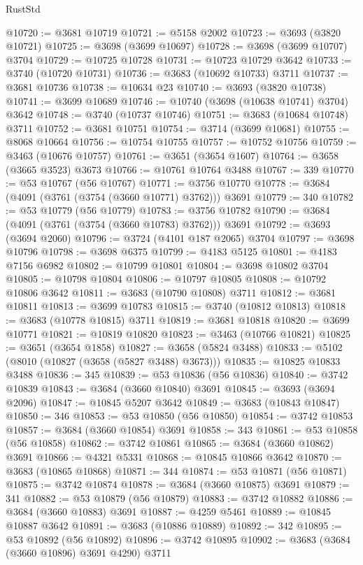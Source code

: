\begin{lexlean}{RustStd}
\begin{coremodule}
@10720 := @3681 @10719
@10721 := @5158 @2002
@10723 := @3693 (@3820 @10721)
@10725 := @3698 (@3699 @10697)
@10728 := @3698 (@3699 @10707) @3704
@10729 := @10725 @10728
@10731 := @10723 @10729 @3642
@10733 := @3740 (@10720 @10731)
@10736 := @3683 (@10692 @10733) @3711
@10737 := @3681 @10736
@10738 := @10634 @23
@10740 := @3693 (@3820 @10738)
@10741 := @3699 @10689
@10746 := @10740 (@3698 (@10638 @10741) @3704) @3642
@10748 := @3740 (@10737 @10746)
@10751 := @3683 (@10684 @10748) @3711
@10752 := @3681 @10751
@10754 := @3714 (@3699 @10681)
@10755 := @8068 @10664
@10756 := @10754 @10755
@10757 := @10752 @10756
@10759 := @3463 (@10676 @10757)
@10761 := @3651 (@3654 @1607)
@10764 := @3658 (@3665 @3523) @3673
@10766 := @10761 @10764 @3488
@10767 := 339
@10770 := @53 @10767 (@56 @10767)
@10771 := @3756 @10770
@10778 := @3684 (@4091 (@3761 (@3754 (@3660 @10771) @3762))) @3691
@10779 := 340
@10782 := @53 @10779 (@56 @10779)
@10783 := @3756 @10782
@10790 := @3684 (@4091 (@3761 (@3754 (@3660 @10783) @3762))) @3691
@10792 := @3693 (@3694 @2060)
@10796 := @3724 (@4101 @187 @2065) @3704
@10797 := @3698 @10796
@10798 := @3698 @6375
@10799 := @4183 @5125
@10801 := @4183 @7156 @6982
@10802 := @10799 @10801
@10804 := @3698 @10802 @3704
@10805 := @10798 @10804
@10806 := @10797 @10805
@10808 := @10792 @10806 @3642
@10811 := @3683 (@10790 @10808) @3711
@10812 := @3681 @10811
@10813 := @3699 @10783
@10815 := @3740 (@10812 @10813)
@10818 := @3683 (@10778 @10815) @3711
@10819 := @3681 @10818
@10820 := @3699 @10771
@10821 := @10819 @10820
@10823 := @3463 (@10766 @10821)
@10825 := @3651 (@3654 @1858)
@10827 := @3658 (@5824 @3488)
@10833 := @5102 (@8010 (@10827 (@3658 (@5827 @3488) @3673)))
@10835 := @10825 @10833 @3488
@10836 := 345
@10839 := @53 @10836 (@56 @10836)
@10840 := @3742 @10839
@10843 := @3684 (@3660 @10840) @3691
@10845 := @3693 (@3694 @2096)
@10847 := @10845 @5207 @3642
@10849 := @3683 (@10843 @10847)
@10850 := 346
@10853 := @53 @10850 (@56 @10850)
@10854 := @3742 @10853
@10857 := @3684 (@3660 @10854) @3691
@10858 := 343
@10861 := @53 @10858 (@56 @10858)
@10862 := @3742 @10861
@10865 := @3684 (@3660 @10862) @3691
@10866 := @4321 @5331
@10868 := @10845 @10866 @3642
@10870 := @3683 (@10865 @10868)
@10871 := 344
@10874 := @53 @10871 (@56 @10871)
@10875 := @3742 @10874
@10878 := @3684 (@3660 @10875) @3691
@10879 := 341
@10882 := @53 @10879 (@56 @10879)
@10883 := @3742 @10882
@10886 := @3684 (@3660 @10883) @3691
@10887 := @4259 @5461
@10889 := @10845 @10887 @3642
@10891 := @3683 (@10886 @10889)
@10892 := 342
@10895 := @53 @10892 (@56 @10892)
@10896 := @3742 @10895
@10902 := @3683 (@3684 (@3660 @10896) @3691 @4290) @3711

\end{coremodule}
\end{lexlean}
